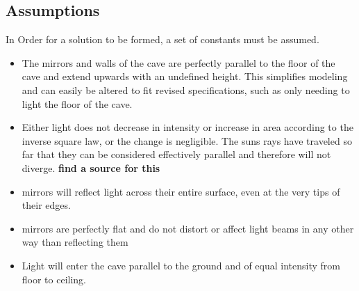 \documentclass[11pt, letterpaper]{article}
\begin{document}
\subsection{Assumptions} 
\par
In Order for a solution to be formed, a set of constants must be assumed.
\begin{itemize}
	\item The mirrors and walls of the cave are perfectly parallel to the floor of the cave and extend upwards with an undefined height. This simplifies modeling and can easily be altered to fit revised specifications, such as only needing to light the floor of the cave.
	

	\item Either light does not decrease in intensity or increase in area according to the inverse square law, or the change is negligible. The suns rays have traveled so far that they can be considered effectively parallel and therefore will not diverge. 
	\textbf{find a source for this}
		
	\item mirrors will reflect light across their entire surface, even at the very tips of their edges. 
	
		\item mirrors are perfectly flat and do not distort or affect light beams in any other way than reflecting them
	
		
	\item Light will enter the cave parallel to the ground and of equal intensity from floor to ceiling.
	

\end{itemize}
\end{document}
